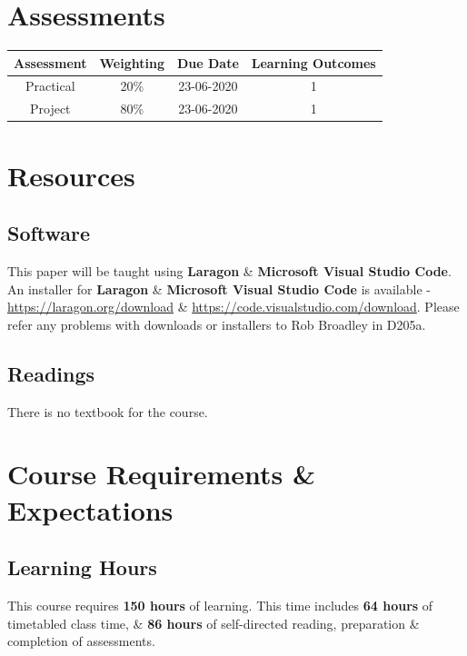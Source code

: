 \documentclass{article}
\begin{document}
\section*{Assessments}
\renewcommand{\arraystretch}{1.5}
\begin{tabular}{|c|c|c|c|}
	\hline
	\textbf{Assessment}                                & \textbf{Weighting} & \textbf{Due Date} & \textbf{Learning Outcomes} \\ \hline 
	\small Practical                       & \small 20\%        & \small 23-06-2020 & \small 1                   \\ \hline
	\small Project                       & \small 80\%        & \small 23-06-2020 & \small 1                   \\ \hline
\end{tabular}

\section*{Resources}

\subsection*{Software}
This paper will be taught using \textbf{Laragon} \& \textbf{Microsoft Visual Studio Code}. An installer for \textbf{Laragon} \& \textbf{Microsoft Visual Studio Code} is available - \href{https://laragon.org/download/index.html}{https://laragon.org/download} \& \href{https://code.visualstudio.com/download}{https://code.visualstudio.com/download}. Please refer any problems with downloads or installers to Rob Broadley in D205a.

\subsection*{Readings}
There is no textbook for the course.

\section*{Course Requirements \& Expectations}

\subsection*{Learning Hours}
This course requires \textbf{150 hours} of learning. This time includes \textbf{64 hours} of timetabled class time, \& \textbf{86 hours} of self-directed reading, preparation \& completion of assessments.
\end{document}
